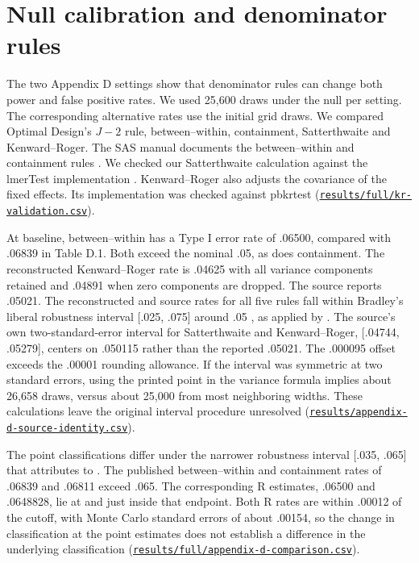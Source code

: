 \section{Null calibration and denominator rules}\label{sec:null}
The two Appendix D settings show that denominator rules can change both power and false positive rates. We used 25,600 draws under the null per setting. The corresponding alternative rates use the initial grid draws. We compared Optimal Design's $J-2$ rule, between--within, containment, Satterthwaite and Kenward--Roger. The SAS manual documents the between--within and containment rules \citep[MODEL statement, DDFM options]{sasmixed}. We checked our Satterthwaite calculation \citep{satterthwaite1946} against the lmerTest implementation \citep{kuznetsova2017}. Kenward--Roger also adjusts the covariance of the fixed effects. Its implementation was checked against pbkrtest \citep{halekoh2014} (\href{https://github.com/alectionary/vibe-math/blob/master/formalization/kupzyk-power-assumptions/results/full/kr-validation.csv}{\nolinkurl{results/full/kr-validation.csv}}).

At baseline, between--within has a Type I error rate of .06500, compared with .06839 in Table D.1. Both exceed the nominal .05, as does containment. The reconstructed Kenward--Roger rate is .04625 with all variance components retained and .04891 when zero components are dropped. The source reports .05021. The reconstructed and source rates for all five rules fall within Bradley’s liberal robustness interval [.025, .075] around .05 \citep{bradley1978}, as applied by \citet[p.~105]{kupzyk2011}. The source's own two-standard-error interval for Satterthwaite and Kenward--Roger, [.04744, .05279], centers on .050115 rather than the reported .05021. The .000095 offset exceeds the .00001 rounding allowance. If the interval was symmetric at two standard errors, using the printed point in the variance formula implies about 26,658 draws, versus about 25,000 from most neighboring widths. These calculations leave the original interval procedure unresolved (\href{https://github.com/alectionary/vibe-math/blob/master/formalization/kupzyk-power-assumptions/results/appendix-d-source-identity.csv}{\nolinkurl{results/appendix-d-source-identity.csv}}).
\label{dis:appendix-d1-interval}

The point classifications differ under the narrower robustness interval [.035, .065] that \citet[p.~105]{kupzyk2011} attributes to \citet{serlin2000}. The published between--within and containment rates of .06839 and .06811 exceed .065. The corresponding R estimates, .06500 and .0648828, lie at and just inside that endpoint. Both R rates are within .00012 of the cutoff, with Monte Carlo standard errors of about .00154, so the change in classification at the point estimates does not establish a difference in the underlying classification (\href{https://github.com/alectionary/vibe-math/blob/master/formalization/kupzyk-power-assumptions/results/full/appendix-d-comparison.csv}{\nolinkurl{results/full/appendix-d-comparison.csv}}).
\label{dis:appendix-d1-serlin}

